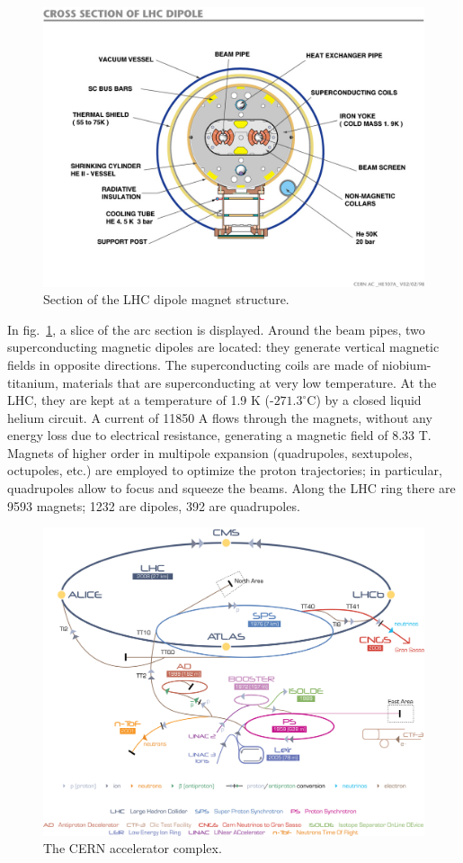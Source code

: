 \begin{figure}[!htb]
  \centering
    \includegraphics[width=.6\textwidth]{figures/LHC-magnets.jpg}
  \caption{Section of the LHC dipole magnet structure.}
  \label{fig:LHC_dipole}
\end{figure}

\noindent In fig.~\ref{fig:LHC_dipole}, a slice of the arc section is displayed. Around the beam pipes, two superconducting magnetic dipoles are located: they generate vertical magnetic fields in opposite directions. The superconducting coils are made of niobium-titanium, materials that are superconducting at very low temperature. At the LHC, they are kept at a temperature of 1.9 K (-$271.3^{\circ}$C) by a closed liquid helium circuit. A current of 11850 A flows through the magnets, without any energy loss due to electrical resistance, generating a magnetic field of 8.33 T. Magnets of higher order in multipole expansion (quadrupoles, sextupoles, octupoles, etc.) are employed to optimize the proton trajectories; in particular, quadrupoles allow to focus and squeeze the beams. Along the LHC ring there are 9593 magnets; 1232 are dipoles, 392 are quadrupoles.

\begin{figure}[!htb]
  \centering
    \includegraphics[width=.75\textwidth]{figures/Cern-Accelerator-Complex.jpg}
  \caption{The CERN accelerator complex.}
  \label{fig:LHC_accelerator_complex}
\end{figure}

